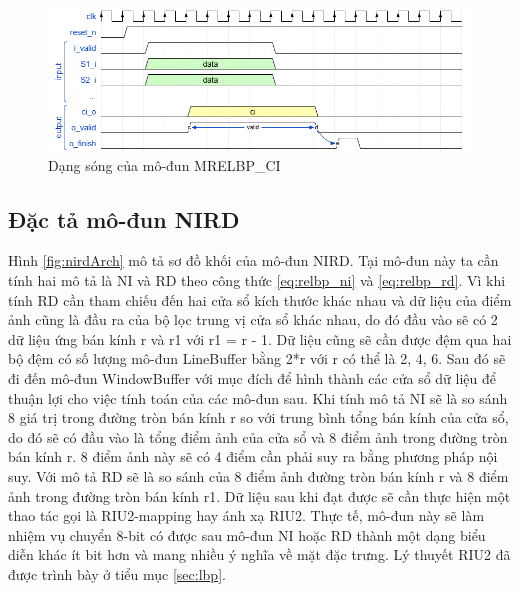 \begin{figure}[!ht]
    \centering
    \includegraphics[width=\linewidth]{figures/mrelbpCI.png}
    \caption{Dạng sóng của mô-đun MRELBP\_CI}
    \label{fig:mrelbpCIl}
\end{figure}
\newpage
\subsection{Đặc tả mô-đun NIRD}

Hình \ref{fig:nirdArch} mô tả sơ đồ khối của mô-đun NIRD. Tại mô-đun này ta cần tính hai mô tả là NI và RD theo công thức \ref{eq:relbp_ni} và \ref{eq:relbp_rd}. Vì khi tính RD cần tham chiếu đến hai cửa sổ kích thước khác nhau và dữ liệu của điểm ảnh cũng là đầu ra của bộ lọc trung vị cửa sổ khác nhau, do đó đầu vào sẽ có 2 dữ liệu ứng bán kính r và r1 với r1 = r - 1. Dữ liệu cũng sẽ cần được đệm qua hai bộ đệm có số lượng mô-đun LineBuffer bằng 2*r với r có thể là 2, 4, 6. Sau đó sẽ đi đến mô-đun WindowBuffer với mục đích để hình thành các cửa sổ dữ liệu để thuận lợi cho việc tính toán của các mô-đun sau. Khi tính mô tả NI sẽ là so sánh 8 giá trị trong đường tròn bán kính r so với trung bình tổng bán kính của cửa sổ, do đó sẽ có đầu vào là tổng điểm ảnh của cửa sổ và 8 điểm ảnh trong đường tròn bán kính r. 8 điểm ảnh này sẽ có 4 điểm cần phải suy ra bằng phương pháp nội suy. Với mô tả RD sẽ là so sánh của 8 điểm ảnh đường tròn bán kính r và 8 điểm ảnh trong đường tròn bán kính r1. Dữ liệu sau khi đạt được sẽ cần thực hiện một thao tác gọi là RIU2-mapping hay ánh xạ RIU2. Thực tế, mô-đun này sẽ làm nhiệm vụ chuyển 8-bit có được sau mô-đun NI hoặc RD thành một dạng biểu diễn khác ít bit hơn và mang nhiều ý nghĩa về mặt đặc trưng. Lý thuyết RIU2 đã được trình bày ở tiểu mục \ref{sec:lbp}.

